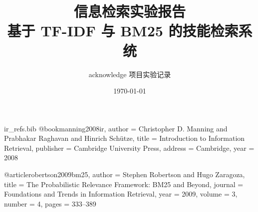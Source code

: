 \begin{filecontents*}{ir_refs.bib}
@book{manning2008ir,
  author    = {Christopher D. Manning and Prabhakar Raghavan and Hinrich Sch\"utze},
  title     = {Introduction to Information Retrieval},
  publisher = {Cambridge University Press},
  address   = {Cambridge},
  year      = {2008}
}

@article{robertson2009bm25,
  author  = {Stephen Robertson and Hugo Zaragoza},
  title   = {The Probabilistic Relevance Framework: BM25 and Beyond},
  journal = {Foundations and Trends in Information Retrieval},
  year    = {2009},
  volume  = {3},
  number  = {4},
  pages   = {333--389}
}
\end{filecontents*}

\documentclass[UTF8,a4paper,12pt]{ctexart}

\usepackage[a4paper,margin=2.2cm]{geometry}
\usepackage{amsmath,amssymb,bm}
\usepackage{booktabs}
\usepackage{array}
\usepackage{float}
\usepackage{caption}
\usepackage{hyperref}
\usepackage{xcolor}
\usepackage{listings}
\usepackage[ruled,vlined,linesnumbered]{algorithm2e}
\usepackage{tikz}
\usepackage{pgfplots}
\usepackage{pgfplotstable}
\usepackage{enumitem}  %
\usepackage{url}       %
\usetikzlibrary{arrows.meta,positioning,shapes.geometric,fit,backgrounds}
\pgfplotsset{compat=1.18}

\hypersetup{
  colorlinks=true,
  linkcolor=blue!45!black,
  citecolor=blue!45!black,
  urlcolor=blue!45!black
}



\DontPrintSemicolon
\SetAlFnt{\small}
\renewcommand{\algorithmcfname}{算法}

\title{信息检索实验报告\\基于 TF-IDF 与 BM25 的技能检索系统}
\author{acknowledge 项目实验记录}
\date{\today}

